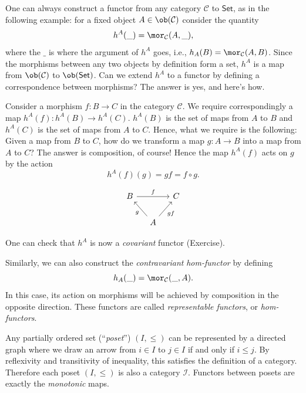 \begin{example}\label{hom-functor example}
\label{Representable functors} One can always construct a functor
from any category $\mathcal{C}$ to $\mathsf{Set}$, as in the following
example: for a fixed object $A\in\ob(\mathcal{C})$ consider the quantity
\begin{equation}
h^{A}(\_)=\mor_{\mathcal{C}}(A,\_),
\end{equation}
where the $\_$ is where the argument of $h^{A}$ goes, i.e., $h_{A}(B)=\mor_{\mathcal{C}}(A,B)$.
Since the morphisms between any two objects by definition form a set,
$h^{A}$ is a map from $\ob(\mathcal{C})$ to $\ob(\mathsf{Set})$.
Can we extend $h^{A}$ to a functor by defining a correspondence between
morphisms? The answer is yes, and here's how.

Consider a morphism $f:B\rightarrow C$ in the category $\mathcal{C}$.
We require correspondingly a map $h^{A}(f):h^{A}(B)\rightarrow h^{A}(C)$.
$h^{A}(B)$ is the set of maps from $A$ to $B$ and $h^{A}(C)$ is
the set of maps from $A$ to $C$. Hence, what we require is the following:
Given a map from $B$ to $C$, how do we transform a map $g:A\rightarrow B$
into a map from $A$ to $C$? The answer is composition, of course! Hence the map $h^{A}(f)$ acts on $g$ by the action
\begin{equation}
h^{A}(f)(g)=gf=f\circ g.
\end{equation}

\begin{equation}
\begin{tikzcd}[column sep=small] 
B \arrow[rr, "f"] & & C\\
& A \arrow[lu, "g"] \arrow[ru, "gf"'] & 
\end{tikzcd}
\end{equation}

One can check that $h^{A}$ is now a \emph{covariant} functor (Exercise).

Similarly, we can also construct the \emph{contravariant} \emph{hom-functor}
by defining\begin{equation} 
h_A(\_) = \mor_\mathcal{C}(\_, A). 
\end{equation} In this case, its action on morphisms will be achieved by composition
in the opposite direction. These functors are called \emph{representable
functors}, or \emph{hom-functors}.
\end{example}
%
\begin{example}\label{poset example}
Any partially ordered set (``\emph{poset}'') $\left(I,\leq\right)$
can be represented by a directed graph where we draw an arrow from
$i\in I$ to $j\in I$ if and only if $i\leq j$. By reflexivity and
transitivity of inequality, this satisfies the definition of a category.
Therefore each poset $(I,\leq)$ is also a category $\mathcal{I}$.
Functors between posets are exactly the \emph{monotonic} maps.
\end{example}
